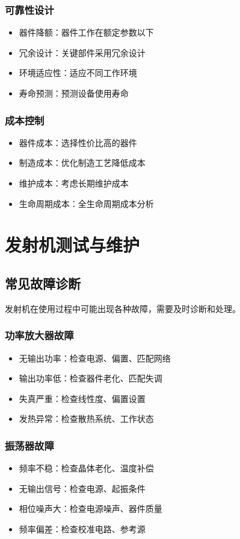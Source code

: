 \documentclass[12pt,UTF8]{ctexbook}
\begin{document}
\subsection{可靠性设计}
\begin{itemize}[leftmargin=3.5em]
    \item 器件降额：器件工作在额定参数以下
    \item 冗余设计：关键部件采用冗余设计
    \item 环境适应性：适应不同工作环境
    \item 寿命预测：预测设备使用寿命
\end{itemize}

\subsection{成本控制}
\begin{itemize}[leftmargin=3.5em]
    \item 器件成本：选择性价比高的器件
    \item 制造成本：优化制造工艺降低成本
    \item 维护成本：考虑长期维护成本
    \item 生命周期成本：全生命周期成本分析
\end{itemize}

\chapter{发射机测试与维护}

\section{常见故障诊断}

发射机在使用过程中可能出现各种故障，需要及时诊断和处理。

\subsection{功率放大器故障}
\begin{itemize}[leftmargin=3.5em]
    \item 无输出功率：检查电源、偏置、匹配网络
    \item 输出功率低：检查器件老化、匹配失调
    \item 失真严重：检查线性度、偏置设置
    \item 发热异常：检查散热系统、工作状态
\end{itemize}

\subsection{振荡器故障}
\begin{itemize}[leftmargin=3.5em]
    \item 频率不稳：检查晶体老化、温度补偿
    \item 无输出信号：检查电源、起振条件
    \item 相位噪声大：检查电源噪声、器件质量
    \item 频率偏差：检查校准电路、参考源
\end{itemize}
\end{document}

